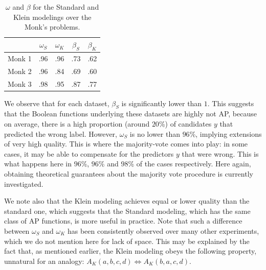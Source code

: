\begin{table}
\centering
\begin{tabular}{| c | c | c | c | c |}
\toprule
  & $\omega_S$  & $\omega_K$ & $\beta_S$  &  $\beta_K$ \\
\midrule
Monk 1 & .96 & .96 & .73 & .62 \\
Monk 2 & .96 & .84 & .69 & .60 \\
Monk 3 & .98 & .95 & .87 & .77 \\
\bottomrule
\end{tabular}
\caption{$\omega$ and $\beta$ for the Standard and Klein modelings over the
  Monk's problems.}
\label{table_monks}
\end{table}

We observe that for each dataset, $\beta_S$ is significantly lower than $1$.
This suggests that the Boolean functions underlying these
datasets are highly not AP, because on average, there is a high proportion
(around $20$\%) of candidates $y$ that predicted the wrong label. However,
$\omega_S$ is no lower than $96$\%, implying extensions of very high quality.
This is where the majority-vote comes into play: in some cases, it may be able
to compensate for the predictors $y$ that were wrong.  This is what happens
here in $96$\%, $96$\% and $98$\% of the cases respectively. Here again,
obtaining theoretical guarantees about the majority vote procedure is currently
investigated.

We note also that the Klein modeling achieves equal or lower quality than the
standard one, which suggests that the Standard modeling, which has the same
class of AP functions, is more useful in practice. Note that such a difference
between $\omega_S$ and $\omega_K$ has been consistently observed over many
other experiments, which we do not mention here for lack of space. This may be
explained by the fact that, as mentioned earlier, the Klein modeling obeys
the following property, unnatural  for an analogy: $A_K(a, b, c, d)
\iff A_K(b, a, c, d)$.

